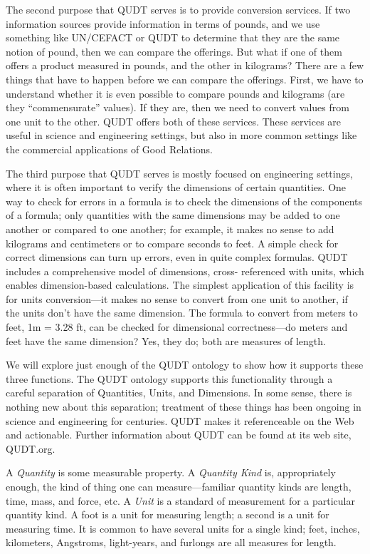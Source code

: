 The second purpose that QUDT serves is to provide conversion services.
If two information sources
provide information in terms of pounds, and we use something like
UN/CEFACT or QUDT to determine that they are the same notion of pound,
then we can compare the offerings. But what if one of them offers a
product measured in pounds, and the other in kilograms? There are a few
things that have to happen before we can compare the offerings. First,
we have to understand whether it is even possible to compare pounds and
kilograms (are they ``commensurate'' values). If they are, then we need
to convert values from one unit to the other. QUDT offers both of these
services. These services are useful in science and engineering settings,
but also in more common settings like the commercial applications of
Good Relations.

The third purpose that QUDT serves is mostly focused on engineering
settings, where it is often important to verify the dimensions of
certain quantities. One way to check for errors in a formula is to check
the dimensions of the components of a formula; only quantities with the
same dimensions may be added to one another or compared to one another;
for example, it makes no sense to add kilograms and centimeters or to
compare seconds to feet. A simple check for correct dimensions can turn
up errors, even in quite complex formulas. QUDT includes a comprehensive
model of dimensions, cross- referenced with units, which enables
dimension-based calculations. The simplest application of this facility
is for units conversion---it makes no sense to convert from one unit to
another, if the units don't have the same dimension. The formula to
convert from meters to feet, 1m = 3.28 ft, can be checked for
dimensional correctness---do meters and feet have the same dimension?
Yes, they do; both are measures of length.

We will explore just enough of the QUDT ontology to show how it supports
these three functions. The QUDT ontology supports this functionality
through a careful separation of Quantities, Units, and Dimensions. In
some sense, there is nothing new about this separation; treatment of
these things has been ongoing in science and engineering for centuries.
QUDT makes it referenceable on the Web and actionable. Further
information about QUDT can be found at its web site, QUDT.org.

A \emph{Quantity} is some measurable property. A \emph{Quantity Kind} is,
appropriately enough, the kind of thing one can measure---familiar
quantity kinds are length, time, mass, and force, etc. A \emph{Unit} is a
standard of measurement for a particular quantity kind. A foot is a unit
for measuring length; a second is a unit for measuring time. It is
common to have several units for a single kind; feet, inches,
kilometers, Angstroms, light-years, and furlongs are all measures for
length.

